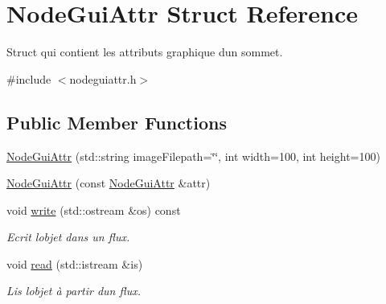\hypertarget{struct_node_gui_attr}{}\section{Node\+Gui\+Attr Struct Reference}
\label{struct_node_gui_attr}


Struct qui contient les attributs graphique d\textquotesingle{}un sommet.  




{\ttfamily \#include $<$nodeguiattr.\+h$>$}

\subsection*{Public Member Functions}
\begin{DoxyCompactItemize}
\item 
\mbox{\hyperlink{struct_node_gui_attr_a97f0593ab84f42b7bd691d6715ccf20f}{Node\+Gui\+Attr}} (std\+::string image\+Filepath=\char`\"{}\char`\"{}, int width=100, int height=100)
\item 
\mbox{\hyperlink{struct_node_gui_attr_abc15288865839636ce85c9e2a5c6dd68}{Node\+Gui\+Attr}} (const \mbox{\hyperlink{struct_node_gui_attr}{Node\+Gui\+Attr}} \&attr)
\item 
void \mbox{\hyperlink{struct_node_gui_attr_aabc33d777e16fd3640cf224edd4e0f9f}{write}} (std\+::ostream \&os) const
\begin{DoxyCompactList}\small\item\em Ecrit l\textquotesingle{}objet dans un flux. \end{DoxyCompactList}\item 
void \mbox{\hyperlink{struct_node_gui_attr_a7ce8e0863f88a40e242bc3ba71c37663}{read}} (std\+::istream \&is)
\begin{DoxyCompactList}\small\item\em Lis l\textquotesingle{}objet à partir d\textquotesingle{}un flux. \end{DoxyCompactList}\end{DoxyCompactItemize}
